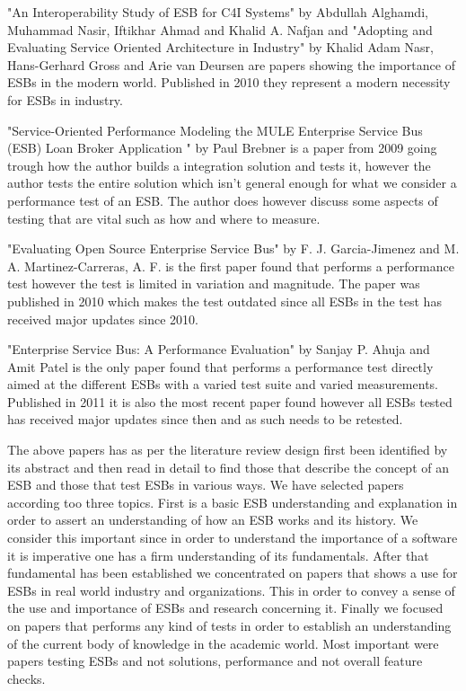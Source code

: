 "An Interoperability  Study  of ESB for C4I  Systems" \cite{Alghamdi2010} by Abdullah Alghamdi, Muhammad Nasir, Iftikhar Ahmad and Khalid A. Nafjan and  "Adopting and Evaluating Service Oriented Architecture in Industry" by Khalid Adam Nasr, Hans-Gerhard Gross and Arie van Deursen are papers showing the importance of ESBs in the modern world. Published in 2010 they represent a modern necessity for ESBs in industry.


"Service-Oriented Performance Modeling the MULE Enterprise Service Bus (ESB) Loan Broker Application " \cite{Brebner2009} by Paul Brebner is a paper from 2009 going trough how the author builds a integration solution and tests it, however the author tests the entire solution which isn't general enough for what we consider a performance test of an ESB. The author does however discuss some aspects of testing that are vital such as how and where to measure.

"Evaluating Open Source Enterprise Service Bus" \cite{Garcia2010} by F. J. Garcia-Jimenez and M. A. Martinez-Carreras, A. F. is the first paper found that performs a performance test however the test is limited in variation and magnitude. The paper was published in 2010 which makes the test outdated since all ESBs in the test has received major updates since 2010.


"Enterprise Service Bus: A Performance Evaluation" \cite{Sanjay2011} by Sanjay P. Ahuja and Amit Patel  is the only paper found that performs a performance test directly aimed at the different ESBs with a varied test suite and varied measurements. Published in 2011 it is also the most recent paper found however all ESBs tested has received major updates since then and as such needs to be retested.

The above papers has as per the literature review design first been identified by its abstract and then read in detail to find those that describe the concept of an ESB and those that test ESBs in various ways. We have selected papers according too three topics. First is a basic ESB understanding and explanation in order to assert an understanding of how an ESB works and its history. We consider this important since in order to understand the importance of a software it is imperative one has a firm understanding of its fundamentals. After that fundamental has been established we concentrated on papers that shows a use for ESBs in real world industry and organizations. This in order to convey a sense of the use and importance of ESBs and research concerning it.
Finally we focused on papers that performs any kind of tests in order to establish an understanding of the current body of knowledge in the academic world. Most important were papers testing ESBs and not solutions, performance and not overall feature checks.

